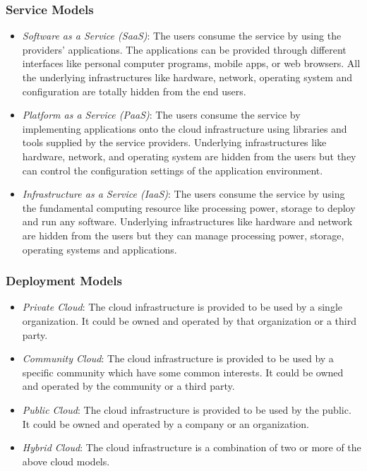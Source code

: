 \subsubsection{Service Models}

\begin{itemize}
    \item \textit{Software as a Service (SaaS)}: The users consume the service by using the providers' applications. The applications can be provided through different interfaces like personal computer programs, mobile apps, or web browsers. All the underlying infrastructures like hardware, network, operating system and configuration are totally hidden from the end users.
    \item \textit{Platform as a Service (PaaS)}: The users consume the service by implementing applications onto the cloud infrastructure using libraries and tools supplied by the service providers. Underlying infrastructures like hardware, network, and operating system are hidden from the users but they can control the configuration settings of the application environment.
    \item \textit{Infrastructure as a Service (IaaS)}: The users consume the service by using the fundamental computing resource like processing power, storage to deploy and run any software. Underlying infrastructures like hardware and network are hidden from the users but they can manage processing power, storage, operating systems and applications.
\end{itemize}

\subsubsection{Deployment Models}

\begin{itemize}
    \item \textit{Private Cloud}: The cloud infrastructure is provided to be used by a single organization. It could be owned and operated by that organization or a third party.
    \item \textit{Community Cloud}: The cloud infrastructure is provided to be used by a specific community which have some common interests. It could be owned and operated by the community or a third party.
    \item \textit{Public Cloud}: The cloud infrastructure is provided to be used by the public. It could be owned and operated by a company or an organization.
    \item \textit{Hybrid Cloud}: The cloud infrastructure is a combination of two or more of the above cloud models.
\end{itemize}

